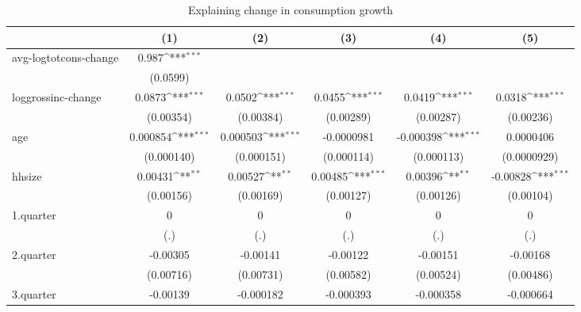 \begin{table}[htbp]\centering
\def\sym#1{\ifmmode^{#1}\else\(^{#1}\)\fi}
\caption{\label{tab:log2.2B-deltacons-gross} Explaining change in consumption growth}
\begin{tabular}{l*{5}{c}}
\hline\hline
            &\multicolumn{1}{c}{(1)}         &\multicolumn{1}{c}{(2)}         &\multicolumn{1}{c}{(3)}         &\multicolumn{1}{c}{(4)}         &\multicolumn{1}{c}{(5)}         \\
\hline
avg-logtotcons-change&       0.987\sym{***}&                     &                     &                     &                     \\
            &    (0.0599)         &                     &                     &                     &                     \\
loggrossinc-change&      0.0873\sym{***}&      0.0502\sym{***}&      0.0455\sym{***}&      0.0419\sym{***}&      0.0318\sym{***}\\
            &   (0.00354)         &   (0.00384)         &   (0.00289)         &   (0.00287)         &   (0.00236)         \\
age         &    0.000854\sym{***}&    0.000503\sym{***}&  -0.0000981         &   -0.000398\sym{***}&   0.0000406         \\
            &  (0.000140)         &  (0.000151)         &  (0.000114)         &  (0.000113)         & (0.0000929)         \\
hhsize      &     0.00431\sym{**} &     0.00527\sym{**} &     0.00485\sym{***}&     0.00396\sym{**} &    -0.00828\sym{***}\\
            &   (0.00156)         &   (0.00169)         &   (0.00127)         &   (0.00126)         &   (0.00104)         \\
1.quarter   &           0         &           0         &           0         &           0         &           0         \\
            &         (.)         &         (.)         &         (.)         &         (.)         &         (.)         \\
2.quarter   &    -0.00305         &    -0.00141         &    -0.00122         &    -0.00151         &    -0.00168         \\
            &   (0.00716)         &   (0.00731)         &   (0.00582)         &   (0.00524)         &   (0.00486)         \\
3.quarter   &    -0.00139         &   -0.000182         &   -0.000393         &   -0.000358         &   -0.000664         \\

\end{tabular}
\end{table}
